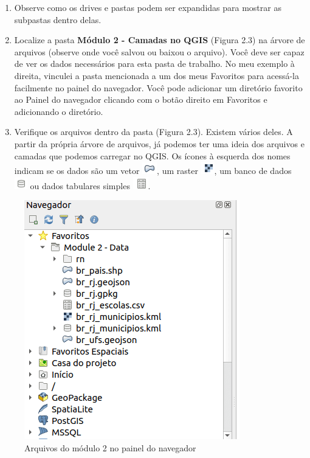 \documentclass[
]{krantz}
\providecommand{\tightlist}{%
  \setlength{\itemsep}{0pt}\setlength{\parskip}{0pt}}
\begin{document}
\begin{enumerate}
\def\labelenumi{\arabic{enumi}.}
\setcounter{enumi}{2}
\tightlist
\item
  Observe como os drives e pastas podem ser expandidas para mostrar as subpastas dentro delas.
\item
  Localize a pasta \textbf{Módulo 2 - Camadas no QGIS} (Figura 2.3) na árvore de arquivos (observe onde você salvou ou baixou o arquivo). Você deve ser capaz de ver os dados necessários para esta pasta de trabalho. No meu exemplo à direita, vinculei a pasta mencionada a um dos meus Favoritos para acessá-la facilmente no painel do navegador. Você pode adicionar um diretório favorito ao Painel do navegador clicando com o botão direito em Favoritos e adicionando o diretório.
\item
  Verifique os arquivos dentro da pasta (Figura 2.3). Existem vários deles. A partir da própria árvore de arquivos, já podemos ter uma ideia dos arquivos e camadas que podemos carregar no QGIS. Os ícones à esquerda dos nomes indicam se os dados são um vetor \includegraphics{media/modulo2/symbol-vector.png}, um raster \includegraphics{media/modulo2/symbol-raster.png}, um banco de dados \includegraphics{media/modulo2/symbol-db.png} ou dados tabulares simples \includegraphics{media/modulo2/symbol-table.png}.
\end{enumerate}

\begin{figure}
\centering
\includegraphics{media/modulo2/qgis-browser-2.png}
\caption{Arquivos do módulo 2 no painel do navegador}
\end{figure}
\end{document}
